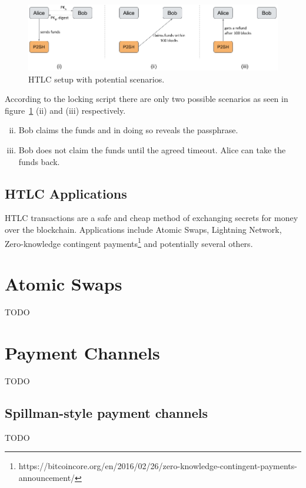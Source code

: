 \begin{figure}[h]
\begin{center}
\includegraphics[scale=0.5]{images/htlc}
\caption{HTLC setup with potential scenarios.}
\label{fig:htlc}
\end{center}
\end{figure}

According to the locking script there are only two possible scenarios as seen in figure~\ref{fig:htlc} (ii) and (iii) respectively.
\begin{enumerate}[(i)]
\setcounter{enumi}{1}
\item Bob claims the funds and in doing so reveals the passphrase.
\item Bob does not claim the funds until the agreed timeout. Alice can take the funds back.
\end{enumerate}

\subsection*{HTLC Applications}
HTLC transactions are a safe and cheap method of exchanging secrets for money over the blockchain. Applications include Atomic Swaps, Lightning Network, Zero-knowledge contingent payments\footnote{https://bitcoincore.org/en/2016/02/26/zero-knowledge-contingent-payments-announcement/} and potentially several others.



\section{Atomic Swaps}
\label{sec:atomic-swaps}
TODO


\section{Payment Channels}
\label{sec:payment-channels}
TODO

\subsection*{Spillman-style payment channels}
TODO


